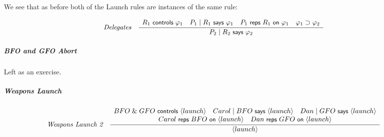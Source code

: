 We see that as before both of the Launch rules are instances of the
same rule:

\begin{footnotesize}
  \begin{gather*}
    \irule {\begin{array}{c} R_1 \controls \varphi_1 \quad
       P_1 \quoting R_1 \says \varphi_1 \quad \reps{P_1}{R_1}{\varphi_1} 
        \quad \varphi_1 \implies \varphi_2
      \end{array}
    } {P_2 \quoting R_2 \says \varphi_2} {Delegates}
  \end{gather*}
\end{footnotesize}

\subparagraph*{BFO and GFO Abort}

Left as an exercise.

\subparagraph*{Weapons Launch}

\begin{footnotesize}
  \begin{gather*}
    \irule {
      \begin{array}[h]{c}
        BFO \with GFO \controls \action{launch} \quad Carol \quoting BFO \says \action{launch} \quad Dan\quoting GFO \says \action{launch} \\
        \reps{Carol}{BFO}{\action{launch}} \quad \reps{Dan}{GFO}{\action{launch}}
      \end{array}
    } {\action{launch}} {Weapons Launch 2}
  \end{gather*}
\end{footnotesize}

